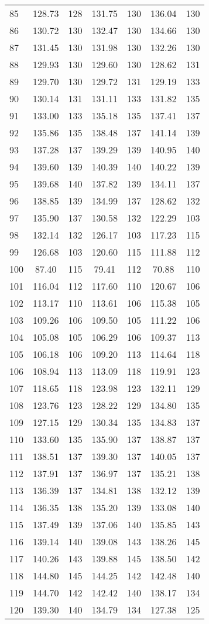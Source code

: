 \begin{center}
\begin{longtable}{lcccccc}
    85 &128.73&128&131.75&130&136.04&130 \\
    86 &130.72&130&132.47&130&134.66&130 \\
    87 &131.45&130&131.98&130&132.26&130 \\
    88 &129.93&130&129.60&130&128.62&131 \\
    89 &129.70&130&129.72&131&129.19&133 \\
    90 &130.14&131&131.11&133&131.82&135 \\
    91 &133.00&133&135.18&135&137.41&137 \\
    92 &135.86&135&138.48&137&141.14&139 \\
    93 &137.28&137&139.29&139&140.95&140 \\
    94 &139.60&139&140.39&140&140.22&139 \\
    95 &139.68&140&137.82&139&134.11&137 \\
    96 &138.85&139&134.99&137&128.62&132 \\
    97 &135.90&137&130.58&132&122.29&103 \\
    98 &132.14&132&126.17&103&117.23&115 \\
    99 &126.68&103&120.60&115&111.88&112 \\
    100& 87.40&115& 79.41&112& 70.88&110 \\
    101&116.04&112&117.60&110&120.67&106 \\
    102&113.17&110&113.61&106&115.38&105 \\
    103&109.26&106&109.50&105&111.22&106 \\
    104&105.08&105&106.29&106&109.37&113 \\
    105&106.18&106&109.20&113&114.64&118 \\
    106&108.94&113&113.09&118&119.91&123 \\
    107&118.65&118&123.98&123&132.11&129 \\
    108&123.76&123&128.22&129&134.80&135 \\
    109&127.15&129&130.34&135&134.83&137 \\
    110&133.60&135&135.90&137&138.87&137 \\
    111&138.51&137&139.30&137&140.05&137 \\
    112&137.91&137&136.97&137&135.21&138 \\
    113&136.39&137&134.81&138&132.12&139 \\
    114&136.35&138&135.20&139&133.08&140 \\
    115&137.49&139&137.06&140&135.85&143 \\
    116&139.14&140&139.08&143&138.26&145 \\
    117&140.26&143&139.88&145&138.50&142 \\
    118&144.80&145&144.25&142&142.48&140 \\
    119&144.70&142&142.42&140&138.17&134 \\
    120&139.30&140&134.79&134&127.38&125 \\
\end{longtable}
\end{center}

